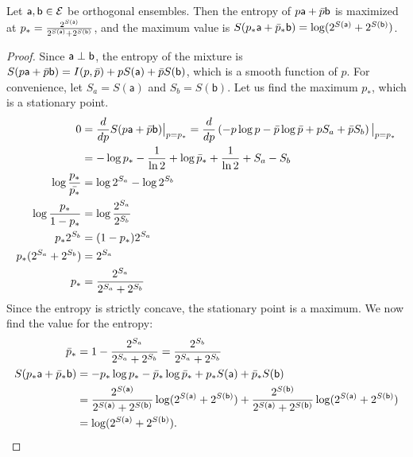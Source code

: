 \begin{mathSection}
	\begin{prop}\label{pm-es-optimalOrthogonalMixing}
		Let $\ens[a], \ens[b] \in \Ens$ be orthogonal ensembles. Then the entropy of $p\ens[a] + \bar{p}\ens[b]$ is maximized at $p_* = \frac{2^{S(\ens[a])}}{2^{S(\ens[a])}+2^{S(\ens[b])}}$, and the maximum value is $S(p_*\ens[a]+\bar{p}_*\ens[b]) = \log(2^{S(\ens[a])}+2^{S(\ens[b])})$.
	\end{prop}
	
	\begin{proof}
		Since $\ens[a] \ortho \ens[b]$, the entropy of the mixture is $S(p\ens[a]+\bar{p}\ens[b]) = I(p,\bar{p}) + pS(\ens[a]) + \bar{p}S(\ens[b])$, which is a smooth function of $p$. For convenience, let $S_a=S(\mathsf a)$ and $S_b=S(\mathsf b)$. Let us find the maximum $p_*$, which is a stationary point.
		\begin{equation}
			\begin{aligned}
				0 &= \frac{d}{dp} S(p \ens[a] + \bar{p}\ens[b]) \big|_{p=p_*} =\frac{d}{dp} \left( - p \log p - \bar{p} \log \bar{p} + p S_a + \bar{p} S_b \right) \big|_{p=p_*} \\
				&= - \log p_* - \frac{1}{\ln 2} + \log \bar{p}_* + \frac{1}{\ln 2} + S_a - S_b \\
				\log \frac{p_*}{\bar{p_*}} &= \log 2^{S_a} - \log 2^{S_b} \\
				\log \frac{p_*}{1-p_*} &= \log \frac{2^{S_a}}{2^{S_b}}  \\
				p_* 2^{S_b} &= (1-p_*) 2^{S_a}  \\
				p_* (2^{S_a} + 2^{S_b}) &= 2^{S_a}  \\
				p_* &= \frac{2^{S_a}}{2^{S_a} + 2^{S_b}}  \\
			\end{aligned}
		\end{equation}
		Since the entropy is strictly concave, the stationary point is a maximum. We now find the value for the entropy:
		\begin{equation}
			\begin{aligned}
				\bar{p}_* &= 1- \frac{2^{S_a}}{2^{S_a} + 2^{S_b}} = \frac{2^{S_b}}{2^{S_a} + 2^{S_b}} \\
				S(p_*\ens[a]+\bar{p}_*\ens[b]) &= -p_*\log p_* - \bar{p}_*\log\bar{p}_* + p_*S(\ens[a]) + \bar{p}_*S(\ens[b]) \\
				&= \frac{2^{S(\ens[a])}}{2^{S(\ens[a])}+2^{S(\ens[b])}}\log(2^{S(\ens[a])}+2^{S(\ens[b])}) + \frac{2^{S(\ens[b])}}{2^{S(\ens[a])}+2^{S(\ens[b])}}\log(2^{S(\ens[a])}+2^{S(\ens[b])}) \\
				&= \log(2^{S(\ens[a])}+2^{S(\ens[b])}).
			\end{aligned}
		\end{equation}
	\end{proof}
	

\end{mathSection}
